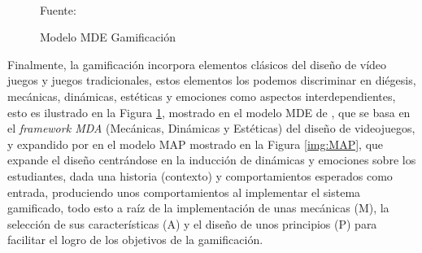 \begin{figure}[ht]
\caption{Modelo MDE Gamificación}
\label{img:MDE}
\centering
{}
\\
{\footnotesize Fuente: }
\end{figure}

Finalmente, la gamificación incorpora elementos clásicos del diseño de vídeo juegos y juegos tradicionales,
estos elementos los podemos discriminar en diégesis, mecánicas, dinámicas, estéticas y emociones como aspectos 
interdependientes, esto es ilustrado en la Figura \ref{img:MDE}, mostrado en el modelo MDE de
, que se basa en el {\it framework MDA} (Mecánicas, Dinámicas y Estéticas) del diseño de
videojuegos, y expandido por  en el modelo MAP mostrado en la Figura \ref{img:MAP}, que 
expande el diseño centrándose en la inducción de dinámicas y emociones sobre los estudiantes, dada una 
historia (contexto) y comportamientos esperados como entrada, produciendo unos comportamientos al implementar
el sistema gamificado, todo esto a raíz de la implementación de unas mecánicas (M), la selección de sus 
características (A) y el diseño de unos principios (P) para facilitar el logro de los objetivos de la
gamificación.

